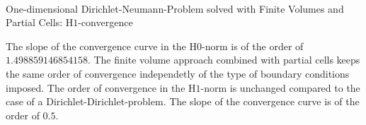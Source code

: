 \documentclass[a4paper,12pt]{article}
\makeatletter
\newenvironment{figurehere}
  {\def\@captype{figure}}
  {}
\makeatother
\begin{document}
\begin{center}
\begin{figurehere}
\\
\caption{One-dimensional Dirichlet-Neumann-Problem solved with Finite Volumes and Partial Cells: H$1$-convergence}\label{fig:fvneumann1dH1}
\end{figurehere}
\end{center}
The slope of the convergence curve in the H$0$-norm is of the order of $1.498859146854158$. The finite volume approach combined with
partial cells keeps the same order of convergence independetly of the type of boundary conditions imposed. The order of convergence in the H$1$-norm is unchanged compared to the case of a Dirichlet-Dirichlet-problem.
The slope of the convergence curve is of the order of $0.5$.
\end{document}
